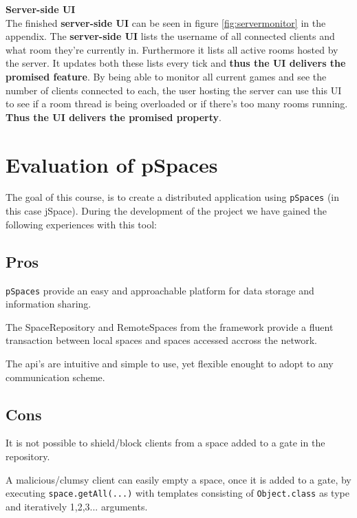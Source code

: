 \textbf{Server-side UI}\\
The finished \textbf{server-side UI} can be seen in figure \ref{fig:servermonitor} in the appendix. The \textbf{server-side UI} lists the username of all connected clients and what room they're currently in. Furthermore it lists all active rooms hosted by the server. It updates both these lists every tick and \textbf{thus the UI delivers the promised feature}. By being able to monitor all current games and see the number of clients connected to each, the user hosting the server can use this UI to see if a room thread is being overloaded or if there's too many rooms running. \textbf{Thus the UI delivers the promised property}. 



\section{Evaluation of pSpaces}

The goal of this course, is to create a distributed application using \texttt{pSpaces} (in this case jSpace). During the development of the project we have gained the following experiences with this tool:

\subsection{Pros}
\texttt{pSpaces} provide an easy and approachable platform for data storage and information sharing. 

The SpaceRepository and RemoteSpaces from the framework provide a fluent transaction between local spaces and spaces accessed accross the network.

The api's are intuitive and simple to use, yet flexible enought to adopt to any communication scheme.

\subsection{Cons}
It is not possible to shield/block clients from a space added to a gate in the repository.

A malicious/clumsy client can easily empty a space, once it is added to a gate, by executing \texttt{space.getAll(...)} with templates consisting of \texttt{Object.class} as type and iteratively 1,2,3... arguments.

